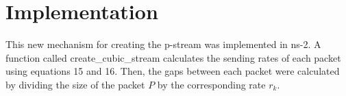 \section{Implementation}
  This new mechanism for creating the p-stream was implemented in ns-2. A 
  function called create\_cubic\_stream calculates the sending rates of each 
  packet using equations 15 and 16. Then, the gaps between each packet were
  calculated by dividing the size of the packet $P$ by the corresponding rate 
  ${r_k}$.

